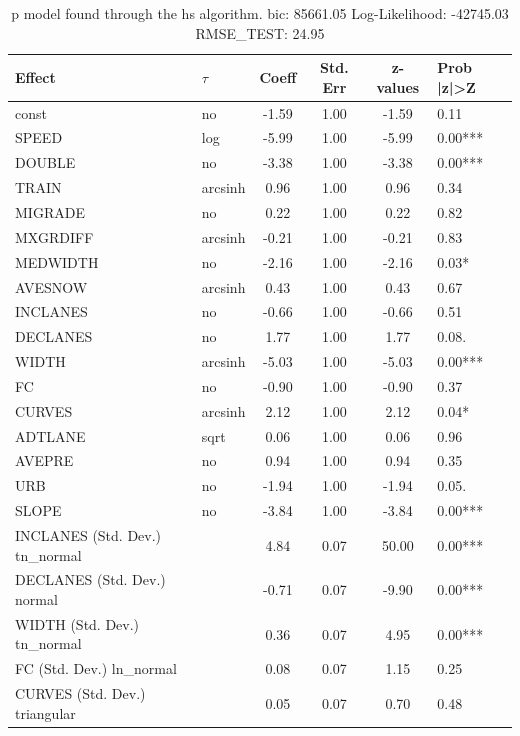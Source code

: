 \begin{table}
	\caption{p model found through the hs algorithm. bic: 85661.05 Log-Likelihood: -42745.03 RMSE_TEST: 24.95}
	\begin{center}
		\begin{tabular}{|l|l|c|c|c|l|}
			\hline
			Effect & $\tau$ & Coeff & Std. Err & z-values & Prob |z|>Z \\
			\hline
			const & no & -1.59 & 1.00 & -1.59 & 0.11 \\
			\hline
			SPEED & log & -5.99 & 1.00 & -5.99 & 0.00*** \\
			\hline
			DOUBLE & no & -3.38 & 1.00 & -3.38 & 0.00*** \\
			\hline
			TRAIN & arcsinh & 0.96 & 1.00 & 0.96 & 0.34 \\
			\hline
			MIGRADE & no & 0.22 & 1.00 & 0.22 & 0.82 \\
			\hline
			MXGRDIFF & arcsinh & -0.21 & 1.00 & -0.21 & 0.83 \\
			\hline
			MEDWIDTH & no & -2.16 & 1.00 & -2.16 & 0.03* \\
			\hline
			AVESNOW & arcsinh & 0.43 & 1.00 & 0.43 & 0.67 \\
			\hline
			INCLANES & no & -0.66 & 1.00 & -0.66 & 0.51 \\
			\hline
			DECLANES & no & 1.77 & 1.00 & 1.77 & 0.08. \\
			\hline
			WIDTH & arcsinh & -5.03 & 1.00 & -5.03 & 0.00*** \\
			\hline
			FC & no & -0.90 & 1.00 & -0.90 & 0.37 \\
			\hline
			CURVES & arcsinh & 2.12 & 1.00 & 2.12 & 0.04* \\
			\hline
			ADTLANE & sqrt & 0.06 & 1.00 & 0.06 & 0.96 \\
			\hline
			AVEPRE & no & 0.94 & 1.00 & 0.94 & 0.35 \\
			\hline
			URB & no & -1.94 & 1.00 & -1.94 & 0.05. \\
			\hline
			SLOPE & no & -3.84 & 1.00 & -3.84 & 0.00*** \\
			\hline
			INCLANES (Std. Dev.) tn_normal &  & 4.84 & 0.07 & 50.00 & 0.00*** \\
			\hline
			DECLANES (Std. Dev.) normal &  & -0.71 & 0.07 & -9.90 & 0.00*** \\
			\hline
			WIDTH (Std. Dev.) tn_normal &  & 0.36 & 0.07 & 4.95 & 0.00*** \\
			\hline
			FC (Std. Dev.) ln_normal &  & 0.08 & 0.07 & 1.15 & 0.25 \\
			\hline
			CURVES (Std. Dev.) triangular &  & 0.05 & 0.07 & 0.70 & 0.48 \\

\end{tabular}
\end{center}
\end{table}
